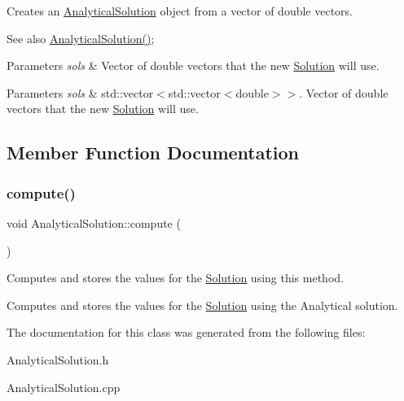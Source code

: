 Creates an \hyperlink{class_analytical_solution}{Analytical\+Solution} object from a vector of double vectors. \begin{DoxySeeAlso}{See also}
\hyperlink{class_analytical_solution_a92a4ce87e863ec7f8aac59372306efd2}{Analytical\+Solution()}; 
\end{DoxySeeAlso}

\begin{DoxyParams}{Parameters}
{\em sols} & Vector of double vectors that the new \hyperlink{class_solution}{Solution} will use. \\
\hline
\end{DoxyParams}

\begin{DoxyParams}{Parameters}
{\em sols} & std\+::vector$<$std\+::vector$<$double$>$$>$. Vector of double vectors that the new \hyperlink{class_solution}{Solution} will use. \\
\hline
\end{DoxyParams}


\subsection{Member Function Documentation}
\mbox{\label{class_analytical_solution_ae1ebc556a8dfed55b6c463625545d919}} 
\subsubsection{\texorpdfstring{compute()}{compute()}}
{\footnotesize\ttfamily void Analytical\+Solution\+::compute (\begin{DoxyParamCaption}{ }\end{DoxyParamCaption})}

Computes and stores the values for the \hyperlink{class_solution}{Solution} using this method.

Computes and stores the values for the \hyperlink{class_solution}{Solution} using the Analytical solution. 

The documentation for this class was generated from the following files\+:\begin{DoxyCompactItemize}
\item 
Analytical\+Solution.\+h\item 
Analytical\+Solution.\+cpp\end{DoxyCompactItemize}
